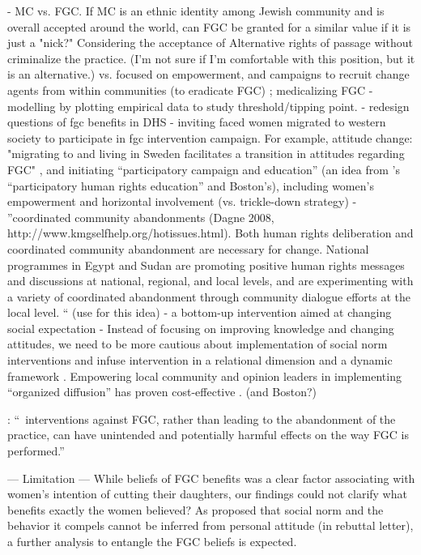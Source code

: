 \documentclass[12pt,]{article}
\begin{document}
- MC vs. FGC.  If MC is an ethnic identity among Jewish community and is overall accepted around the world, can FGC be granted for a similar value if it is just a "nick?"
Considering the acceptance of Alternative rights of passage \cite{GaluKama15} without criminalize the practice. (I'm not sure if I'm comfortable with this position, but it is an alternative.) vs. focused on empowerment, and campaigns to recruit change agents from within communities (to eradicate FGC) \cite{ShelHern13, Will18}; medicalizing FGC \cite{LeyeVanE19}
- modelling by plotting empirical data to study threshold/tipping point.
- redesign questions of fgc benefits in DHS
- inviting faced women migrated to western society to participate in fgc intervention campaign.  For example,  attitude change: "migrating to and living in Sweden facilitates a transition in attitudes regarding FGC" \cite{WahlJohn17}, and initiating “participatory campaign and education”  (an idea from \cite{MackLeJe08}’s “participatory human rights education” and Boston’s), including women’s empowerment and horizontal involvement (vs. trickle-down strategy)
- \cite{MackLeJe08}”coordinated community abandonments (Dagne 2008, http://www.kmgselfhelp.org/hotissues.html). Both human rights deliberation and coordinated community abandonment are necessary for change. National programmes in Egypt and Sudan are promoting positive human rights messages and discussions at national, regional, and local levels, and are experimenting with a variety of coordinated abandonment through community dialogue efforts at the local level. “ (use \cite{Dagn09, MackLeJe08} for this idea)
- a bottom-up intervention aimed at changing social expectation \cite{BiccMari15}
- Instead of focusing on improving knowledge and changing attitudes, we need to be more cautious about implementation of social norm interventions and infuse intervention in a relational dimension and a dynamic framework \cite{CislHeis18a, CislHeis18b, McCh15}.  Empowering local community and opinion leaders in implementing “organized diffusion” \cite{MackLeJe08}has proven cost-effective \cite{CislDenn19}. (and Boston?)

\cite{Cami15}: “ interventions against FGC, rather than leading to the abandonment of the practice, can have unintended and potentially harmful effects on the way FGC is performed.”


— Limitation —
While beliefs of FGC benefits was a clear factor associating with women’s intention of cutting their daughters, our findings could not clarify what benefits exactly the women believed?  As proposed that social norm and the behavior it compels cannot be inferred from personal attitude \cite{Mack18} (in rebuttal letter), a further analysis to entangle the FGC beliefs is expected.
\end{document}
